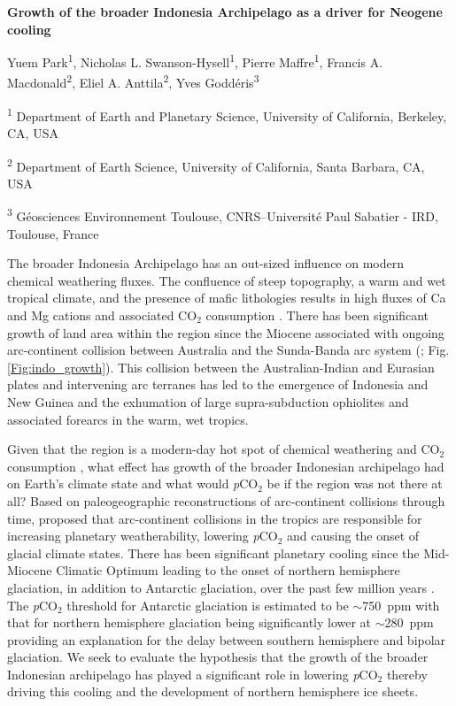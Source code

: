 \documentclass[11pt,letterpaper]{article}
\newcommand{\pCOtwo}{\textit{p}CO$_{2}$\xspace}
\newcommand{\COtwo}{CO$_{2}$\xspace}
\begin{document}
\begin{flushleft}
{\Large \textbf{Growth of the broader Indonesia Archipelago as a driver for Neogene cooling}}

Yuem Park\textsuperscript{1},
Nicholas L. Swanson-Hysell\textsuperscript{1},
Pierre Maffre\textsuperscript{1},
Francis A. Macdonald\textsuperscript{2},
Eliel A. Anttila\textsuperscript{2},
Yves Godd\'eris\textsuperscript{3}

\bigskip
\textsuperscript{1} Department of Earth and Planetary Science, University of California, Berkeley, CA, USA

\textsuperscript{2} Department of Earth Science, University of California, Santa Barbara, CA, USA

\textsuperscript{3} G\'eosciences Environnement Toulouse, CNRS--Universit\'e Paul Sabatier - IRD, Toulouse, France

\bigskip

\end{flushleft}

\linenumbers

The broader Indonesia Archipelago has an out-sized influence on modern chemical weathering fluxes. The confluence of steep topography, a warm and wet tropical climate, and the presence of mafic lithologies results in high fluxes of Ca and Mg cations and associated \COtwo consumption \citep{Hartmann2009a, Hartmann2014a}. There has been significant growth of land area within the region since the Miocene associated with ongoing arc-continent collision between Australia and the Sunda-Banda arc system (\citealp{Molnar2015a}; Fig. \ref{Fig:indo_growth}). This collision between the Australian-Indian and Eurasian plates and intervening arc terranes has led to the emergence of Indonesia and New Guinea and the exhumation of large supra-subduction ophiolites and associated forearcs in the warm, wet tropics.

Given that the region is a modern-day hot spot of chemical weathering and \COtwo consumption \citep{Hartmann2009a}, what effect has growth of the broader Indonesian archipelago had on Earth's climate state and what would \pCOtwo be if the region was not there at all? Based on paleogeographic reconstructions of arc-continent collisions through time, \citet{Macdonald2019a} proposed that arc-continent collisions in the tropics are responsible for increasing planetary weatherability, lowering \pCOtwo and causing the onset of glacial climate states. There has been significant planetary cooling since the Mid-Miocene Climatic Optimum leading to the onset of northern hemisphere glaciation, in addition to Antarctic glaciation, over the past few million years \citep{Shackleton1984a}. The \pCOtwo threshold for Antarctic glaciation is estimated to be $\sim$750~ppm with that for northern hemisphere glaciation being significantly lower at $\sim$280~ppm \citep{DeConto2008a} providing an explanation for the delay between southern hemisphere and bipolar glaciation. We seek to evaluate the hypothesis that the growth of the broader Indonesian archipelago has played a significant role in lowering \pCOtwo thereby driving this cooling and the development of northern hemisphere ice sheets.
\end{document}
